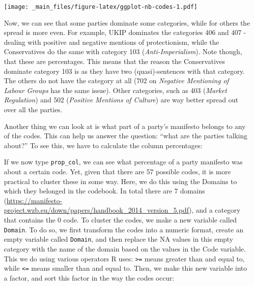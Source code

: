 \documentclass[
]{book}
\newenvironment{Shaded}{\begin{snugshade}}{\end{snugshade}}
\newcommand{\DecValTok}[1]{\textcolor[rgb]{0.00,0.00,0.81}{#1}}
\newcommand{\FunctionTok}[1]{\textcolor[rgb]{0.13,0.29,0.53}{\textbf{#1}}}
\newcommand{\NormalTok}[1]{#1}
\newcommand{\OtherTok}[1]{\textcolor[rgb]{0.56,0.35,0.01}{#1}}
\newcommand{\SpecialCharTok}[1]{\textcolor[rgb]{0.81,0.36,0.00}{\textbf{#1}}}
\newcommand{\StringTok}[1]{\textcolor[rgb]{0.31,0.60,0.02}{#1}}
\begin{document}
\texttt{[image: \_main\_files/figure-latex/ggplot-nb-codes-1.pdf]}

Now, we can see that some parties dominate some categories, while for others the spread is more even. For example, UKIP dominates the categories 406 and 407 - dealing with positive and negative mentions of protectionism, while the Conservatives do the same with category 103 (\emph{Anti-Imperialism}). Note though, that these are percentages. This means that the reason the Conservatives dominate category 103 is as they have two (quasi)-sentences with that category. The others do not have the category at all (702 on \emph{Negative Mentioning of Labour Groups} has the same issue). Other categories, such as 403 (\emph{Market Regulation}) and 502 (\emph{Positive Mentions of Culture}) are way better spread out over all the parties.

Another thing we can look at is what part of a party's manifesto belongs to any of the codes. This can help us answer the question: ``what are the parties talking about?'' To see this, we have to calculate the column percentages:

\begin{Shaded}
\end{Shaded}

If we now type \texttt{prop\_col}, we can see what percentage of a party manifesto was about a certain code. Yet, given that there are 57 possible codes, it is more practical to cluster these in some way. Here, we do this using the Domains to which they belonged in the codebook. In total there are 7 domains (\url{https://manifesto-project.wzb.eu/down/papers/handbook_2014_version_5.pdf}), and a category that contains the 0 code. To cluster the codes, we make a new variable called \texttt{Domain}. To do so, we first transform the codes into a numeric format, create an empty variable called \texttt{Domain}, and then replace the NA values in this empty category with the name of the domain based on the values in the Code variable. This we do using various operators R uses: \texttt{\textgreater{}=} means greater than and equal to, while \texttt{\textless{}=} means smaller than and equal to. Then, we make this new variable into a factor, and sort this factor in the way the codes occur:
\end{document}
